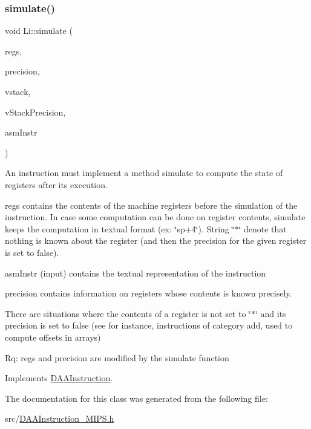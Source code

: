 \subsubsection{\texorpdfstring{simulate()}{simulate()}}
{\footnotesize\ttfamily void Li\+::simulate (\begin{DoxyParamCaption}\item[{vector$<$ string $>$ \&}]{regs,  }\item[{vector$<$ bool $>$ \&}]{precision,  }\item[{\hyperlink{DAAInstruction_8h_a1b0e70ac1a04f06c8132055ed01f589f}{stack\+Type} \&}]{vstack,  }\item[{\hyperlink{DAAInstruction_8h_ac5cb793e9dac3fa9693da78b7e29ab30}{stack\+Prec\+Type} \&}]{v\+Stack\+Precision,  }\item[{const string \&}]{asm\+Instr }\end{DoxyParamCaption})\hspace{0.3cm}{\ttfamily [virtual]}}

An instruction must implement a method simulate to compute the state of registers after its execution.

regs contains the contents of the machine registers before the simulation of the instruction. In case some computation can be done on register contents, simulate keeps the computation in textual format (ex\+: \char`\"{}sp+4\char`\"{}). String \char`\"{}$\ast$\char`\"{} denote that nothing is known about the register (and then the precision for the given register is set to false).

asm\+Instr (input) contains the textual representation of the instruction

precision contains information on registers whose contents is known precisely.

There are situations where the contents of a register is not set to \char`\"{}$\ast$\char`\"{} and its precision is set to false (see for instance, instructions of category add, used to compute offsets in arrays)

Rq\+: regs and precision are modified by the simulate function 

Implements \hyperlink{classDAAInstruction_a61d0b9bece1e0ead89a46c0197276324}{D\+A\+A\+Instruction}.



The documentation for this class was generated from the following file\+:\begin{DoxyCompactItemize}
\item 
src/\hyperlink{DAAInstruction__MIPS_8h}{D\+A\+A\+Instruction\+\_\+\+M\+I\+P\+S.\+h}\end{DoxyCompactItemize}

